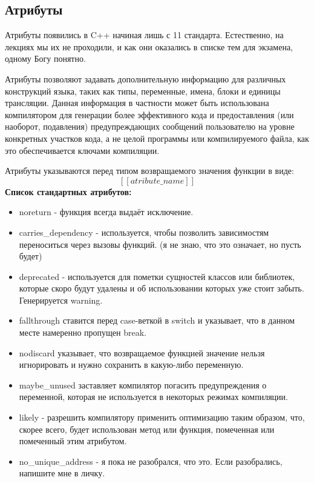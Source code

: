 \subsection{Атрибуты}
\begin{notice}
    Атрибуты появились в C++ начиная лишь с 11 стандарта. Естественно, на лекциях мы их не проходили, и как они оказались в списке тем для экзамена, одному Богу понятно.
\end{notice}
\begin{definition}
    Атрибуты позволяют задавать дополнительную информацию для различных конструкций языка, таких как типы, переменные, имена, блоки и единицы трансляции. Данная информация в частности может быть использована компилятором для генерации более эффективного кода и предоставления (или наоборот, подавления) предупреждающих сообщений пользователю на уровне конкретных участков кода, а не целой программы или компилируемого файла, как это обеспечивается ключами компиляции. 
\end{definition}
Атрибуты указываются перед типом возвращаемого значения функции в виде:
$$
[[atribute\_name]]
$$
\textbf{Список стандартных атрибутов:}
\begin{itemize}
    \item noreturn - функция всегда выдаёт исключение.
    \item carries\_dependency - используется, чтобы позволить зависимостям переноситься через вызовы функций. (я не знаю, что это означает, но пусть будет)
    \item deprecated - используется для пометки сущностей классов или библиотек, которые скоро будут удалены и об использовании которых уже стоит забыть. Генерируется warning.
    \item fallthrough ставится перед case-веткой в switch и указывает, что в данном месте намеренно пропущен break.
    \item nodiscard указывает, что возвращаемое функцией значение нельзя игнорировать и нужно сохранить в какую-либо переменную.
    \item maybe\_unused заставляет компилятор погасить предупреждения о переменной, которая не используется в некоторых режимах компиляции.
    \item likely - разрешить компилятору применить оптимизацию таким образом, что, скорее всего, будет использован метод или функция, помеченная или помеченный этим атрибутом.
    \item no\_unique\_address - я пока не разобрался, что это. Если разобрались, напишите мне в личку.
\end{itemize}

